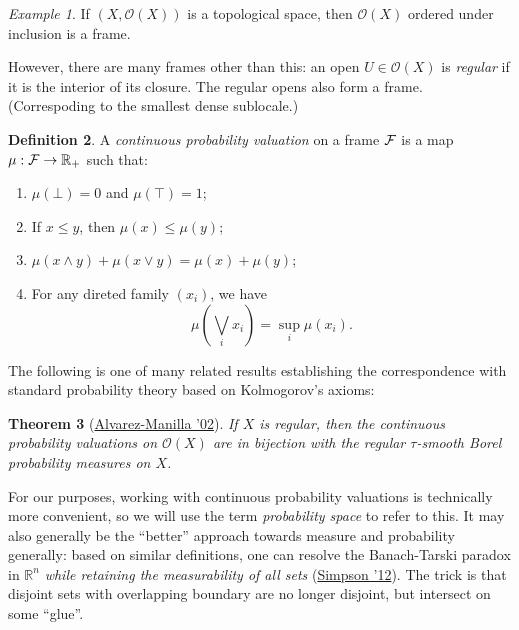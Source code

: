 \documentclass[11pt, oneside, article]{memoir}
\theoremstyle{plain}
\newtheorem{theorem}{Theorem}[chapter] %
\theoremstyle{definition}
\newtheorem{definition}[theorem]{Definition}
\theoremstyle{remark}
\newtheorem{example}[theorem]{Example}
\begin{document}
\newcommand{\Open}[1]{\mathcal{O}(#1)}

\begin{example}
If $(X,\Open{X})$ is a topological space, then $\Open{X}$ ordered under inclusion is a frame.
\end{example}

However, there are many frames other than this: an open $U\in\Open{X}$ is \emph{regular} if it is the interior of its closure. The regular opens also form a frame. (Correspoding to the smallest dense sublocale.)

\newcommand{\R}{\mathbb{R}}

\begin{definition}
A \emph{continuous probability valuation} on a frame $\mathcal{F}$ is a map $\mu : \Frame \to \R_+$ such that:
\begin{enumerate}
\item $\mu(\bot) = 0$ and $\mu(\top) = 1$;
\item If $x\leq y$, then $\mu(x) \leq \mu(y)$;
\item $\mu(x \land y) + \mu(x \lor y) = \mu(x) + \mu(y)$;
\item For any direted family $(x_i)$, we have
\[
	\mu\left( \bigvee_i x_i \right) = \sup_i \mu(x_i).
\]
\end{enumerate}
\end{definition}

The following is one of many related results establishing the correspondence with standard probability theory based on Kolmogorov's axioms:

\begin{theorem}[\href{https://www.sciencedirect.com/science/article/pii/S0166864101002498}{Alvarez-Manilla '02}]
If $X$ is regular, then the continuous probability valuations on $\Open{X}$ are in bijection with the regular $\tau$-smooth Borel probability measures on $X$.
\end{theorem}

For our purposes, working with continuous probability valuations is technically more convenient, so we will use the term \emph{probability space} to refer to this. It may also generally be the ``better'' approach towards measure and probability generally: based on similar definitions, one can resolve the Banach-Tarski paradox in $\R^n$ \emph{while retaining the measurability of all sets} (\href{https://www.sciencedirect.com/science/article/pii/S0168007211001874}{Simpson '12}). The trick is that disjoint sets with overlapping boundary are no longer disjoint, but intersect on some ``glue''.
\end{document}
